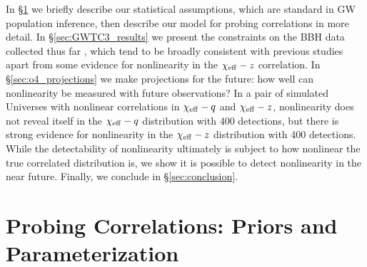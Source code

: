 \documentclass[%
 reprint,
 amsmath,amssymb,
 aps,
 prd,
]{revtex4-2}
\newcommand{\chieff}{\chi_{\rm eff}}
\newcommand{\rednote}[1]{{\color{Red} #1}}
\begin{document}
In \S \ref{sec:probe_correlations} we briefly describe our statistical assumptions, which are standard in \acf{GW} population inference, then describe our model for probing correlations in more detail. In \S \ref{sec:GWTC3_results} we present the constraints on the BBH data collected thus far \cite{LIGOScientific:2021djp}, which tend to be broadly consistent with previous studies apart from some evidence for nonlinearity in the $\chieff-z$ correlation. %
In \S \ref{sec:o4_projections} we make projections for the future: how well can nonlinearity be measured with future observations? In a pair of simulated Universes with nonlinear correlations in $\chieff-q$ and $\chieff-z$, nonlinearity does not reveal itself in the $\chieff-q$ distribution with 400 detections, but there is strong evidence for nonlinearity in the $\chieff-z$ distribution with 400 detections. While the detectability of nonlinearity ultimately is subject to how nonlinear the true correlated distribution is, we show it is possible to detect nonlinearity in the near future. 
Finally, we conclude in \S \ref{sec:conclusion}.

\section{Probing Correlations: Priors and Parameterization}
\label{sec:probe_correlations}




\end{document}
